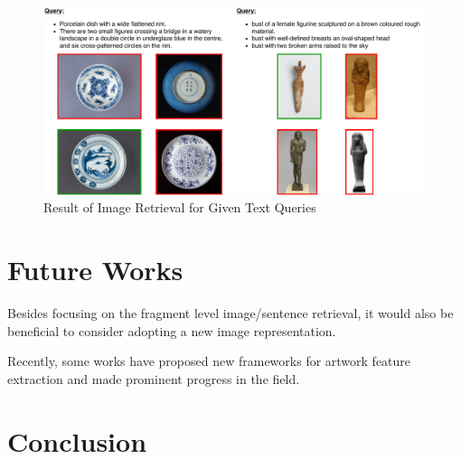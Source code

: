 \begin{figure}[h!]
\centering
\includegraphics[width=\textwidth]{t2i.pdf}
\caption{Result of Image Retrieval for Given Text Queries
}
\label{fig:t2i}
\end{figure}

\section{Future Works}
Besides focusing on the fragment level image/sentence retrieval, it would also be beneficial to consider adopting a new image representation. 

Recently, some works \cite{TranslatingArtworks,parttowhole,Art2Real} have proposed new frameworks for artwork feature extraction and made prominent progress in the field. 


\section{Conclusion}


